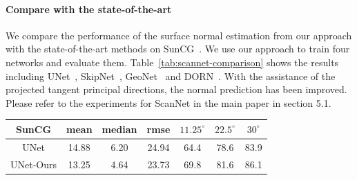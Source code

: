 \paragraph{Compare with the state-of-the-art} We compare the performance of the surface normal estimation from our approach with the state-of-the-art methods on SunCG~\cite{song2015sun}. We use our approach to train four networks and evaluate them. Table~\ref{tab:scannet-comparison} shows the results including UNet~\cite{ronneberger2015u}, SkipNet~\cite{bansal2016marr}, GeoNet~\cite{qi2018geonet} and DORN~\cite{fu2018deep}. With the assistance of the projected tangent principal directions, the normal prediction has been improved. Please refer to the experiments for ScanNet in the main paper in section 5.1.
\begin{table}[h]
    \centering
    \tabcolsep=0.08cm
    \begin{tabular}{|c|c|c|c||c|c|c|}
         \hline
         \textbf{SunCG} & mean & median & rmse & $11.25^\circ$ & $22.5^\circ$ & $30^\circ$\\
         \hline
         UNet & 14.88 & 6.20 & 24.94 & 64.4 & 78.6 & 83.9\\
         \hline
         UNet-Ours & 13.25 & 4.64 & 23.73 & 69.8 & 81.6 & 86.1\\

\end{tabular}
\end{table}
